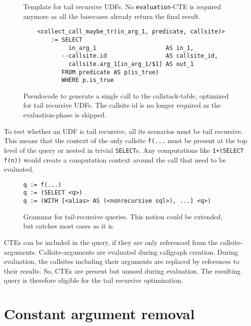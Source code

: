 \begin{figure}
    \centering
    \caption{Template for tail recursive UDFs. No \texttt{evaluation}-CTE is required anymore as all the basecases already return the final result.}
    \label{tr_opt_template}
\end{figure}


\begin{figure}[h!]\centering\small
    \begin{verbatim}
    <collect_call_maybe_tr(in_arg_1, predicate, callsite)>
        := SELECT
             in_arg_1                    AS in_1, 
           --callsite.id                 AS callsite_id,
             callsite.arg_1[in_arg_1/$1] AS out_1
           FROM predicate AS p(is_true)
           WHERE p.is_true
    \end{verbatim}
  \caption{Pseudocode to generate a single call to the callstack-table, optimized for tail recursive UDFs. The callsite id is no longer required as the evaluation-phase is skipped.}
  \label{marco:collect_call_maybe_optimized}
\end{figure}

To test whether an UDF is tail recursive, all its scenarios must be tail recursive. This means that the context of the only callsite \texttt{f(...} must be present at the top level of the query or nested in trivial \texttt{SELECT}s. Any computations like \texttt{1+(SELECT f(n))} would create a computation context around the call that need to be evaluated.

\begin{figure}
    \centering
\begin{verbatim}
q := f(...)
q := (SELECT <q>)
q := (WITH [<alias> AS (<nonrecursive sql>), ...] <q>)
\end{verbatim}
    \caption{Grammar for tail-recursive queries. This notion could be extended, but catches most cases as it is.}
    \label{tr_grammar}
\end{figure}

CTEs can be included in the query, if they are only referenced from the callsite-arguments. Callsite-arguments are evaluated during callgraph creation. During evaluation, the callsites including their arguments are replaced by references to their results. So, CTEs are present but unused during evaluation. The resulting query is therefore eligible for the tail recursive optimization.

\section{Constant argument removal}

